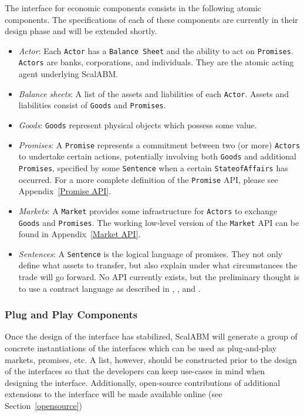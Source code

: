 \documentclass[a4paper]{article}
\begin{document}
The interface for economic components consists in the following atomic components. The specifications of each of these components are currently in their design phase and will be extended shortly.

\begin{itemize}
	\item \textit{Actor}: Each \texttt{Actor} has a \texttt{Balance Sheet} and the ability to act on \texttt{Promises}. \texttt{Actors} are banks, corporations, and individuals. They are the atomic acting agent underlying ScalABM.
    \item \textit{Balance sheets}: A list of the assets and liabilities of each \texttt{Actor}. Assets and liabilities consist of \texttt{Goods} and \texttt{Promises}. 
    \item \textit{Goods}: \texttt{Goods} represent physical objects which possess some value.
    \item \textit{Promises}: A \texttt{Promise} represents a commitment between two (or more) \texttt{Actors} to undertake certain actions, potentially involving both \texttt{Goods} and additional \texttt{Promises}, specified by some \texttt{Sentence} when a certain \texttt{StateofAffairs} has occurred. For a more complete definition of the \texttt{Promise} API, please see Appendix~\ref{Promise API}. 
    \item \textit{Markets}: A \texttt{Market} provides some infrastructure for \texttt{Actors} to exchange \texttt{Goods} and \texttt{Promises}. The working low-level version of the \texttt{Market} API can be found in Appendix~\ref{Market API}.
    \item \textit{Sentences}: A \texttt{Sentence} is the logical language of promises. They not only define what assets to transfer, but also explain under what circumstances the trade will go forward. No API currently exists, but the preliminary thought is to use a contract language as described in \citet{Bahr2015certified}, \citet{bahr2014towards}, and \citet{Andersen2006}.
\end{itemize}

\subsubsection{Plug and Play Components}

Once the design of the interface has stabilized, ScalABM will generate a group of concrete instantiations of the interfaces which can be used as plug-and-play markets, promises, etc. A list, however, should be constructed prior to the design of the interfaces so that the developers can keep use-cases in mind when designing the interface. Additionally, open-source contributions of additional extensions to the interface will be made available online (see Section~\ref{opensource}) 
\end{document}
